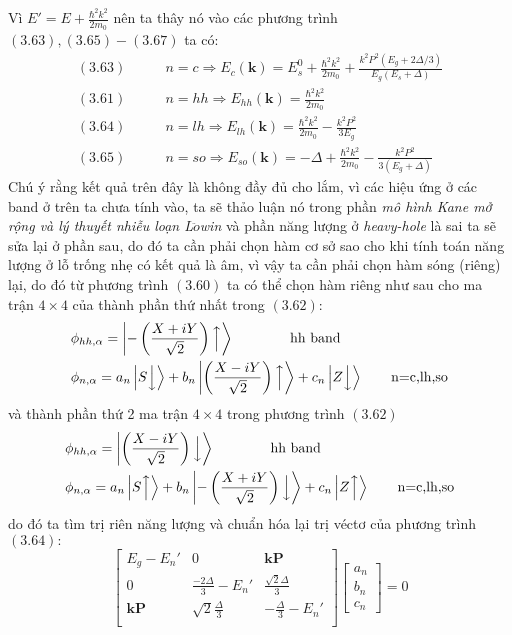 Vì $E'=E+\frac{\hbar^2 k^2}{2m_0}$ nên ta thây nó vào các phương trình $(3.63),(3.65)-(3.67)$ ta có:
\begin{align}
(3.63)&\qquad n=c \Longrightarrow E_c(\mathbf{k})=E_s^0 +\frac{\hbar^2 k^2}{2m_0}+ \frac{k^2P^2(E_g+2\Delta /3)}{E_g(E_s+\Delta)}\\
(3.61)&\qquad n=hh \Longrightarrow E_{hh}(\mathbf{k})=\frac{\hbar^2 k^2}{2m_0}\\
(3.64)&\qquad n=lh \Longrightarrow E_{lh}(\mathbf{k})=\frac{\hbar^2 k^2}{2m_0}-\frac{k^2P^2}{3E_g}\\
(3.65)&\qquad n=so \Longrightarrow E_{so}(\mathbf{k})=-\Delta +\frac{\hbar^2 k^2}{2m_0}-\frac{k^2P^2}{3(E_g+\Delta)}
\end{align}
Chú ý rằng kết quả trên đây là không đầy đủ cho lắm, vì các hiệu ứng ở các band ở trên ta chưa tính vào, ta sẽ thảo luận nó trong phần \emph{mô hình Kane mở rộng và lý thuyết nhiễu loạn L$\ddot{o}$win} và phần năng lượng ở \emph{heavy-hole} là sai ta sẽ sửa lại ở phần sau, do đó ta cần phải chọn hàm cơ sở sao cho khi tính toán năng lượng ở lỗ trống nhẹ có kết quả là âm, vì vậy ta cần phải chọn hàm sóng (riêng) lại, do đó từ phương trình $(3.60)$ ta có thể chọn hàm riêng như sau cho ma trận $4\times 4$ của thành phần thứ nhất trong $(3.62)$:
\begin{align*}
&\phi_{hh,\alpha}=\left |-\left(\frac{X+iY}{\sqrt{2}}\right)\Bigl\uparrow\right\rangle \qquad \qquad\text{hh band}\\
&\phi_{n,\alpha}=a_n\left | S\Bigl\downarrow\right\rangle +b_n\left |\left(\frac{X-iY}{\sqrt{2}}\right)\Bigl\uparrow\right\rangle +c_n\left |Z\Bigl\downarrow\right\rangle \qquad \text{n=c,lh,so}
\end{align*}
và thành phần thứ 2 ma trận $4\times4$ trong phương trình $(3.62)$
\begin{align*}
&\phi_{hh,\alpha}=\left |\left(\frac{X-iY}{\sqrt{2}}\right)\Bigl\downarrow\right\rangle \qquad \qquad\text{hh band}\\
&\phi_{n,\alpha}=a_n\left |S\Bigl\uparrow\right\rangle +b_n\left |-\left(\frac{X+iY}{\sqrt{2}}\right)\Bigl\downarrow\right\rangle +c_n\left |Z\Bigl\uparrow\right\rangle \qquad \text{n=c,lh,so}
\end{align*}
do đó ta tìm  trị riên năng lượng và chuẩn hóa lại trị véctơ của phương trình $(3.64):$
\begin{equation}
\begin{bmatrix}
E_g -E_n' &0 &\mathbf{kP}  \\
0 &\frac{-2\Delta}{3}-E_n' &\frac{\sqrt{2}\Delta}{3} \\
\mathbf{kP} &\sqrt{2}\frac{\Delta}{3} &-\frac{\Delta}{3}-E_n' \\
\end{bmatrix}
\begin{bmatrix}
a_n \\b_n \\c_n
\end{bmatrix}
=0
\end{equation}
